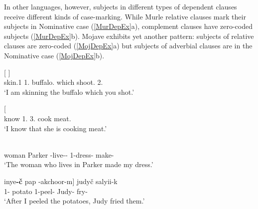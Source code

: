 In other languages, however, subjects in different types of dependent clauses receive different kinds of case-marking.
While Murle relative clauses mark their subjects in Nominative  case (\ref{MurDepEx}a), complement clauses have zero-coded subjects (\ref{MurDepEx}b).
Mojave exhibits yet another pattern: subjects of relative clauses are zero-coded (\ref{MojDepEx}a) but subjects of adverbial clauses are in the Nominative  case (\ref{MojDepEx}b). 

\begin{exe}\ex\label{MurDepEx}
\begin{xlist}
\ex\gll{}    {\rm[}  \textbf{}{\rm]}\\
skin.1\sg{} 1\sg{}.\nom{} buffalo.\acc{} which shoot.\pst{} 2\sg{}.\nom{}\\
`I am skinning the buffalo which you shot.'

\ex\gll{}   {\rm[}\textbf{}  \textipa{idiN}{\rm]}\\
know 1\sg{}.\nom{} 3\sg{}.\acc{} cook meat.\acc{}\\
`I know that she is cooking meat.'
\end{xlist}
\end{exe}

\begin{exe}\ex\label{MojDepEx}
\begin{xlist}
\ex\gll  {\rm[}\textbf{}  \textipa{k\super{w}-n\super{y}avay{\rm]}-n\super{y}-\v c}  \\
woman Parker \relativ{}-live-\dem{}-\nom{} 1-dress-\dem{} make-\tns{}\\
\glt `The woman who lives in Parker made my dress.'

\ex\gll  {\rm[}\textglotstop inye\textbf{-\v c} pap \textglotstop-akchoor-m{\rm]} judy\v c salyii-k\\
1\sg{}-\nom{} potato 1-peel-\dsbj{} Judy-\nom{} fry-\tns{}\\
\glt `After I peeled the potatoes, Judy fried them.' %
\end{xlist}
\end{exe}

